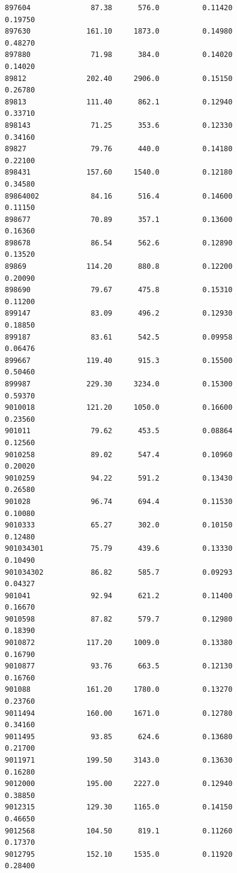 \documentclass[
  letterpaper,
  DIV=11,
  numbers=noendperiod]{scrartcl}
\begin{document}
\begin{verbatim}
897604              87.38      576.0          0.11420           0.19750
897630             161.10     1873.0          0.14980           0.48270
897880              71.98      384.0          0.14020           0.14020
89812              202.40     2906.0          0.15150           0.26780
89813              111.40      862.1          0.12940           0.33710
898143              71.25      353.6          0.12330           0.34160
89827               79.76      440.0          0.14180           0.22100
898431             157.60     1540.0          0.12180           0.34580
89864002            84.16      516.4          0.14600           0.11150
898677              70.89      357.1          0.13600           0.16360
898678              86.54      562.6          0.12890           0.13520
89869              114.20      880.8          0.12200           0.20090
898690              79.67      475.8          0.15310           0.11200
899147              83.09      496.2          0.12930           0.18850
899187              83.61      542.5          0.09958           0.06476
899667             119.40      915.3          0.15500           0.50460
899987             229.30     3234.0          0.15300           0.59370
9010018            121.20     1050.0          0.16600           0.23560
901011              79.62      453.5          0.08864           0.12560
9010258             89.02      547.4          0.10960           0.20020
9010259             94.22      591.2          0.13430           0.26580
901028              96.74      694.4          0.11530           0.10080
9010333             65.27      302.0          0.10150           0.12480
901034301           75.79      439.6          0.13330           0.10490
901034302           86.82      585.7          0.09293           0.04327
901041              92.94      621.2          0.11400           0.16670
9010598             87.82      579.7          0.12980           0.18390
9010872            117.20     1009.0          0.13380           0.16790
9010877             93.76      663.5          0.12130           0.16760
901088             161.20     1780.0          0.13270           0.23760
9011494            160.00     1671.0          0.12780           0.34160
9011495             93.85      624.6          0.13680           0.21700
9011971            199.50     3143.0          0.13630           0.16280
9012000            195.00     2227.0          0.12940           0.38850
9012315            129.30     1165.0          0.14150           0.46650
9012568            104.50      819.1          0.11260           0.17370
9012795            152.10     1535.0          0.11920           0.28400

\end{verbatim}
\end{document}
